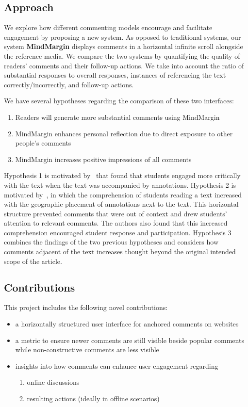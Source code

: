 \subsection{Approach}

We explore how different commenting models encourage and facilitate engagement by proposing a new system. As opposed to traditional systems, our system \textbf{MindMargin} displays comments in a horizontal infinite scroll alongside the reference media. We compare the two systems by quantifying the quality of readers' comments and their follow-up actions. We take into account the ratio of substantial responses to overall responses, instances of referencing the text correctly/incorrectly, and follow-up actions.

We have several hypotheses regarding the comparison of these two interfaces:
\begin{enumerate}
\item Readers will generate more substantial comments using MindMargin
\item MindMargin enhances personal reflection due to direct exposure to other people's comments
\item MindMargin increases positive impressions of all comments
\end{enumerate}

Hypothesis 1 is motivated by~\cite{AnnotationsStudents} that found that students engaged more critically with the text when the text was accompanied by annotations. 
Hypothesis 2 is motivated by~\cite{NB}, in which the comprehension of students reading a text increased with the geographic placement of annotations next to the text. This horizontal structure prevented comments that were out of context and drew students' attention to relevant comments. The authors also found that this increased comprehension encouraged student response and participation.
Hypothesis 3 combines the findings of the two previous hypotheses and considers how comments adjacent of the text increases thought beyond the original intended scope of the article.

\subsection{Contributions}

This project includes the following novel contributions:

\begin{itemize}
\item a horizontally structured user interface for anchored comments on websites
\item a metric to ensure newer comments are still visible beside popular comments while non-constructive comments are less visible
\item insights into how comments can enhance user engagement regarding
\begin{enumerate}
\item online discussions
\item resulting actions (ideally in offline scenarios)
\end{enumerate}

\end{itemize}